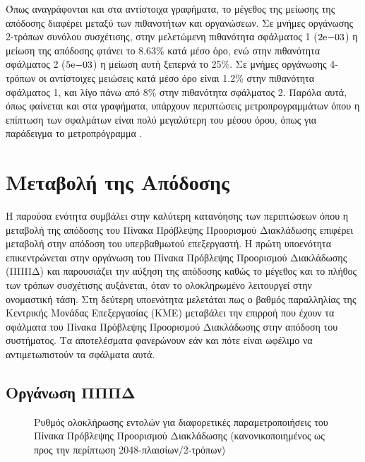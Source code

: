 Όπως αναγράφονται και στα αντίστοιχα γραφήματα, το μέγεθος της μείωσης της απόδοσης διαφέρει μεταξύ των πιθανοτήτων και οργανώσεων. Σε μνήμες οργάνωσης 2-τρόπων συνόλου συσχέτισης, στην μελετώμενη πιθανότητα σφάλματος 1 ($2\mathrm{e}{-03}$) η μείωση της απόδοσης φτάνει το 8.63\% κατά μέσο όρο, ενώ στην πιθανότητα σφάλματος 2 ($5\mathrm{e}{-03}$) η μείωση αυτή ξεπερνά το 25\%. Σε μνήμες οργάνωσης 4-τρόπων οι αντίστοιχες μειώσεις κατά μέσο όρο είναι 1.2\% στην πιθανότητα σφάλματος 1, και λίγο πάνω από 8\% στην πιθανότητα σφάλματος 2. Παρόλα αυτά, όπως φαίνεται και στα γραφήματα, υπάρχουν περιπτώσεις μετροπρογραμμάτων όπου η επίπτωση των σφαλμάτων είναι πολύ μεγαλύτερη του μέσου όρου, όπως για παράδειγμα το μετροπρόγραμμα .


\section{Μεταβολή της Απόδοσης}
\label{chap4_PerformanceVariation}

Η παρούσα ενότητα συμβάλει στην καλύτερη κατανόησης των περιπτώσεων όπου η μεταβολή της απόδοσης του Πίνακα Πρόβλεψης Προορισμού Διακλάδωσης επιφέρει μεταβολή στην απόδοση του υπερβαθμωτού επεξεργαστή. Η πρώτη υποενότητα επικεντρώνεται στην οργάνωση του Πίνακα Πρόβλεψης Προορισμού Διακλάδωσης (ΠΠΠΔ) και παρουσιάζει την αύξηση της απόδοσης καθώς το μέγεθος και το πλήθος των τρόπων συσχέτισης αυξάνεται, όταν το ολοκληρωμένο λειτουργεί στην ονομαστική τάση. Στη δεύτερη υποενότητα μελετάται πως ο βαθμός παραλληλίας της Κεντρικής Μονάδας Επεξεργασίας (ΚΜΕ) μεταβάλει την επιρροή που έχουν τα σφάλματα του Πίνακα Πρόβλεψης Προορισμού Διακλάδωσης στην απόδοση του συστήματος. Τα αποτελέσματα φανερώνουν εάν και πότε είναι ωφέλιμο να αντιμετωπιστούν τα σφάλματα αυτά.


\subsection{Οργάνωση ΠΠΠΔ}
\label{chap4_BTBConfigIPC}

\begin{figure}[!b]
    \centering
    \caption{Ρυθμός ολοκλήρωσης εντολών για διαφορετικές παραμετροποιήσεις του Πίνακα Πρόβλεψης Προορισμού Διακλάδωσης (κανονικοποιημένος ως προς την περίπτωση 2048-πλαισίων/2-τρόπων)}
    \label{fig:chap4_btb_config_performance}
\end{figure}

